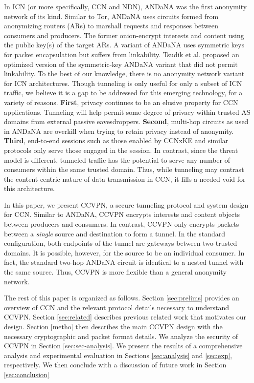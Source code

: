 In ICN (or more specifically, CCN and NDN), ANDaNA was the first anonymity network of its
kind. Similar to Tor, ANDaNA uses circuits formed from anonymizing routers (ARs)
to marshall requests and responses between consumers and producers. The former
onion-encrypt interests and content using the public key(s) of the target ARs.
A variant of ANDaNA uses symmetric keys for packet encapsulation but suffers from
linkability. Tsudik et al. \cite{tsudik2016ac3n} proposed an optimized version of the symmetric-key
ANDaNA variant that did not permit linkability. To the best of our knowledge, there
is no anonymity network variant for ICN architectures. Though tunneling is only
useful for only a subset of ICN traffic, we believe it is a gap to be addressed
for this emerging technology, for a variety of reasons. {\bf First}, privacy
continues to be an elusive property for CCN applications. Tunneling will help
permit some degree of privacy within trusted AS domains from external passive
eavesdroppers. {\bf Second}, multi-hop circuits as used in ANDaNA are overkill
when trying to retain privacy instead of anonymity. {\bf Third}, end-to-end
sessions such as those enabled by CCNxKE \cite{ccnxke} and similar protocols
only serve those engaged in the session. In contrast, since the threat model is
different, tunneled traffic has the potential to serve any number of consumers
within the same trusted domain. Thus, while tunneling may contrast the content-centric
nature of data transmission in CCN, it fills a needed void for this architecture.

In this paper, we present CCVPN, a secure tunneling protocol and system design for
CCN. Similar to ANDaNA, CCVPN encrypts interests and content objects between producers
and consumers. In contrast, CCVPN only encrypts packets between a \emph{single}
source and destination to form a tunnel. In the standard configuration, both
endpoints of the tunnel are gateways between two trusted domains. It is possible,
however, for the source to be an individual consumer. In fact, the standard two-hop
ANDaNA circuit is identical to a nested tunnel with the same source. Thus,
CCVPN is more flexible than a general anonymity network.

The rest of this paper is organized as follows. Section \ref{sec:prelims} provides
an overview of CCN and the relevant protocol details necessary to understand
CCVPN. Section \ref{sec:related} describes previous related work that motivates
our design. Section \ref{metho} then describes the main CCVPN design with the necessary
cryptographic and packet format details. We analyze the security of CCVPN
in Section \ref{sec:sec-analysis}. We present the results of a comprehensive
analysis and experimental evaluation in Sections \ref{sec:analysis} and \ref{sec:exp},
respectively. We then conclude with a discussion of future work in Section \ref{sec:conclusion}
